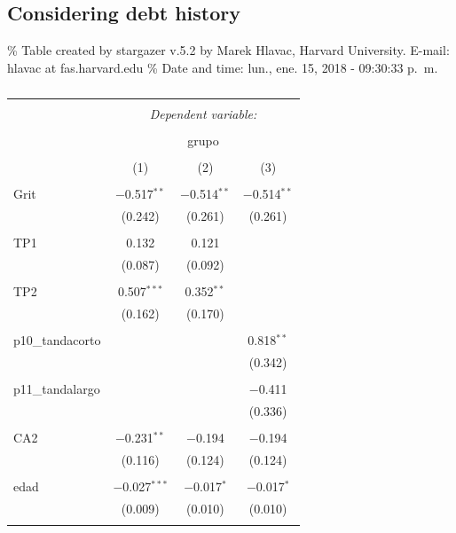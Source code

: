 \documentclass[]{article}
\begin{document}
\subsection{Considering debt history}\label{considering-debt-history}

\% Table created by stargazer v.5.2 by Marek Hlavac, Harvard University.
E-mail: hlavac at fas.harvard.edu \% Date and time: lun., ene. 15, 2018
- 09:30:33 p.~m.

\begin{table}[!htbp] \centering 
  \caption{} 
  \label{} 
\begin{tabular}{@{\extracolsep{5pt}}lccc} 
\\[-1.8ex]\hline 
\hline \\[-1.8ex] 
 & \multicolumn{3}{c}{\textit{Dependent variable:}} \\ 
\cline{2-4} 
\\[-1.8ex] & \multicolumn{3}{c}{grupo} \\ 
\\[-1.8ex] & (1) & (2) & (3)\\ 
\hline \\[-1.8ex] 
 Grit & $-$0.517$^{**}$ & $-$0.514$^{**}$ & $-$0.514$^{**}$ \\ 
  & (0.242) & (0.261) & (0.261) \\ 
  & & & \\ 
 TP1 & 0.132 & 0.121 &  \\ 
  & (0.087) & (0.092) &  \\ 
  & & & \\ 
 TP2 & 0.507$^{***}$ & 0.352$^{**}$ &  \\ 
  & (0.162) & (0.170) &  \\ 
  & & & \\ 
 p10\_tandacorto &  &  & 0.818$^{**}$ \\ 
  &  &  & (0.342) \\ 
  & & & \\ 
 p11\_tandalargo &  &  & $-$0.411 \\ 
  &  &  & (0.336) \\ 
  & & & \\ 
 CA2 & $-$0.231$^{**}$ & $-$0.194 & $-$0.194 \\ 
  & (0.116) & (0.124) & (0.124) \\ 
  & & & \\ 
 edad & $-$0.027$^{***}$ & $-$0.017$^{*}$ & $-$0.017$^{*}$ \\ 
  & (0.009) & (0.010) & (0.010) \\ 
  & & & \\ 

\end{tabular}
\end{table}
\end{document}

